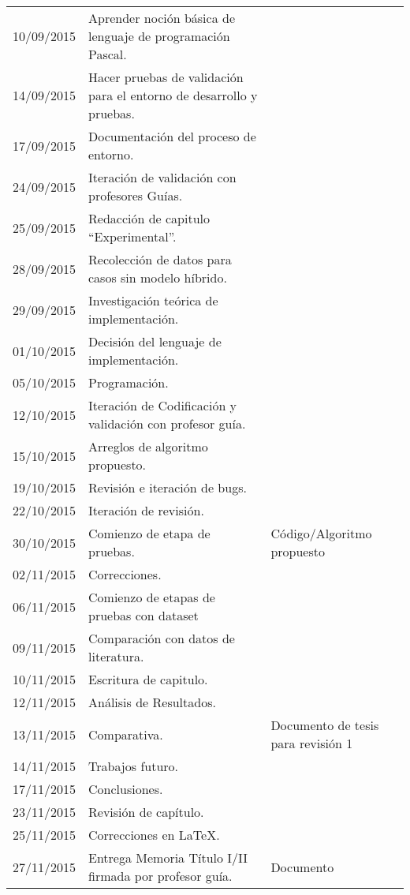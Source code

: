 \documentclass{udparticle}
\begin{document}
\begin{center}
\begin{xtabular}{lp{7cm}p{6cm}}
  		10/09/2015 & Aprender noción básica de lenguaje de programación Pascal.& \\
  		14/09/2015 & Hacer pruebas de validación para el entorno de desarrollo y pruebas.& \\
  		17/09/2015 & Documentación del proceso de entorno.& \\
  		24/09/2015 & Iteración de validación con profesores Guías.& \\
  		25/09/2015 & Redacción de capitulo ``Experimental''.& \\
  		28/09/2015 & Recolección de datos para casos sin modelo híbrido.& \\
  		29/09/2015 & Investigación teórica de implementación.& \\
  		
  		01/10/2015 & Decisión del lenguaje de implementación.& \\
  		05/10/2015 & Programación. & \\
  		12/10/2015 & Iteración de Codificación y validación con profesor guía.& \\
  		15/10/2015 & Arreglos de algoritmo propuesto.& \\
  		19/10/2015 & Revisión e iteración de bugs. & \\
  		22/10/2015 & Iteración de revisión. & \\
  		30/10/2015 & Comienzo de etapa de pruebas.&  Código/Algoritmo propuesto \\
  		
  		02/11/2015 & Correcciones. & \\
  		06/11/2015 & Comienzo de etapas de pruebas con dataset& \\
  		09/11/2015 & Comparación con datos de literatura.& \\
  		10/11/2015 & Escritura de capitulo.& \\
  		12/11/2015 & Análisis de Resultados.& \\
  		13/11/2015 & Comparativa.&  Documento de tesis para revisión 1 \\
  		14/11/2015 & Trabajos futuro.& \\
  		17/11/2015 & Conclusiones.& \\
  		23/11/2015 & Revisión de capítulo.& \\
  		25/11/2015 & Correcciones en \LaTeX. & \\
  		27/11/2015 & Entrega Memoria Título I/II firmada por profesor guía.&  Documento \\ 
  		

\end{xtabular}
\end{center}
\end{document}
